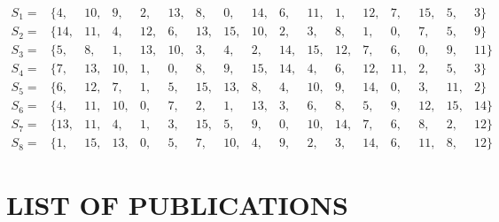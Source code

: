 \begin{appendices}
\begin{equation}
    \nonumber
    \begin{array}{lllllllllllllllll}
        S_1 =&  \{4, &  10, &  9, &  2, &  13, &  8, &  0, &  14, &  6, &  11, &  1, &  12, &  7, &  15, &  5, &  3 \} \\
        S_2 =&  \{14, &  11, &  4, &  12, &  6, &  13, &  15, &  10, &  2, &  3, &  8, &  1, &  0, &  7, &  5, &  9 \} \\
        S_3 =&  \{5, &  8, &  1, &  13, &  10, &  3, &  4, &  2, &  14, &  15, &  12, &  7, &  6, &  0, &  9, &  11 \} \\
        S_4 =&  \{7, &  13, &  10, &  1, &  0, &  8, &  9, &  15, &  14, &  4, &  6, &  12, &  11, &  2, &  5, &  3 \} \\
        S_5 =&  \{6, &  12, &  7, &  1, &  5, &  15, &  13, &  8, &  4, &  10, &  9, &  14, &  0, &  3, &  11, &  2 \} \\
        S_6 =&  \{4, &  11, &  10, &  0, &  7, &  2, &  1, &  13, &  3, &  6, &  8, &  5, &  9, &  12, &  15, &  14 \} \\
        S_7 =&  \{13, &  11, &  4, &  1, &  3, &  15, &  5, &  9, &  0, &  10, &  14, &  7, &  6, &  8, &  2, &  12 \} \\
        S_8 =&  \{1, &  15, &  13, &  0, &  5, &  7, &  10, &  4, &  9, &  2, &  3, &  14, &  6, &  11, &  8, &  12 \}
    \end{array}
\end{equation}


\chapter{LIST OF PUBLICATIONS}

\begingroup
\renewcommand{\chapter}[2]{}%
\end{appendices}
